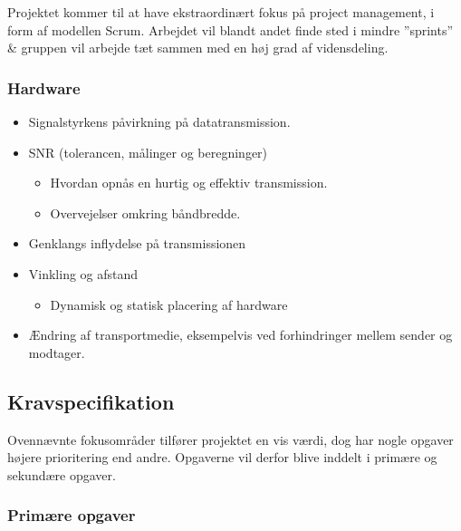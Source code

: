 Projektet kommer til at have ekstraordinært fokus på project management, i form af modellen Scrum. Arbejdet vil blandt andet finde sted i mindre ”sprints” \& gruppen vil arbejde tæt sammen med en høj grad af vidensdeling.

\subsubsection{Hardware}

\begin{itemize}[noitemsep]
  \item Signalstyrkens påvirkning på datatransmission.
  \item SNR (tolerancen, målinger og beregninger)
  \begin{itemize}[noitemsep]
  \item Hvordan opnås en hurtig og effektiv transmission.
  \item Overvejelser omkring båndbredde.
  \end{itemize}
  \item Genklangs inflydelse på transmissionen
  \item Vinkling og afstand
  \begin{itemize}[noitemsep]
  \item Dynamisk og statisk placering af hardware
  \end{itemize}
  \item Ændring af transportmedie, eksempelvis ved forhindringer mellem sender og modtager.
\end{itemize}

\subsection{Kravspecifikation}

Ovennævnte fokusområder tilfører projektet en vis værdi, dog har nogle opgaver højere prioritering end andre. Opgaverne vil derfor blive inddelt i primære og sekundære opgaver.

\subsubsection{Primære opgaver}

